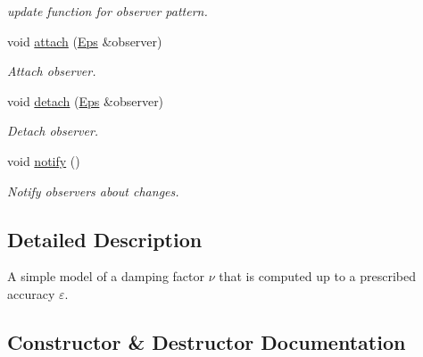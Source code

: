 \begin{DoxyCompactItemize}
\begin{DoxyCompactList}\small\item\em update function for observer pattern. \end{DoxyCompactList}\item 
\hypertarget{classSpacy_1_1Mixin_1_1MixinConnection_abb5520ee6b22dd993d78f142939a1ed4}{}void \hyperlink{classSpacy_1_1Mixin_1_1MixinConnection_abb5520ee6b22dd993d78f142939a1ed4}{attach} (\hyperlink{classSpacy_1_1Mixin_1_1Eps_a51dbe0b9cc950e0f3dfd34a481f08ae4}{Eps} \&observer)\label{classSpacy_1_1Mixin_1_1MixinConnection_abb5520ee6b22dd993d78f142939a1ed4}

\begin{DoxyCompactList}\small\item\em Attach observer. \end{DoxyCompactList}\item 
\hypertarget{classSpacy_1_1Mixin_1_1MixinConnection_adda739590c487679c26f60e50aedb73f}{}void \hyperlink{classSpacy_1_1Mixin_1_1MixinConnection_adda739590c487679c26f60e50aedb73f}{detach} (\hyperlink{classSpacy_1_1Mixin_1_1Eps_a51dbe0b9cc950e0f3dfd34a481f08ae4}{Eps} \&observer)\label{classSpacy_1_1Mixin_1_1MixinConnection_adda739590c487679c26f60e50aedb73f}

\begin{DoxyCompactList}\small\item\em Detach observer. \end{DoxyCompactList}\item 
\hypertarget{classSpacy_1_1Mixin_1_1MixinConnection_a1ddeaa78a3bb4a38c2cca36d1f99fe36}{}void \hyperlink{classSpacy_1_1Mixin_1_1MixinConnection_a1ddeaa78a3bb4a38c2cca36d1f99fe36}{notify} ()\label{classSpacy_1_1Mixin_1_1MixinConnection_a1ddeaa78a3bb4a38c2cca36d1f99fe36}

\begin{DoxyCompactList}\small\item\em Notify observers about changes. \end{DoxyCompactList}\end{DoxyCompactItemize}


\subsection{Detailed Description}
A simple model of a damping factor $\nu$ that is computed up to a prescribed accuracy $\varepsilon$. 

\subsection{Constructor \& Destructor Documentation}
\hypertarget{classSpacy_1_1DampingFactor_a03128fa4d2d17bd2024eaaff5a6cf03a}{}
